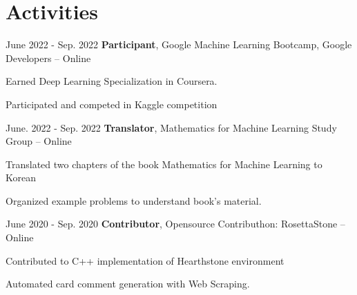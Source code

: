 \section{Activities}

\begin{twocolentry}{
June 2022 - Sep. 2022
}
\textbf{Participant}, Google Machine Learning Bootcamp, Google Developers -- Online
\end{twocolentry}

\vspace{0.10 cm}
\begin{onecolentry}
\begin{highlights}
\item Earned Deep Learning Specialization in Coursera.
\item Participated and competed in Kaggle competition
\end{highlights}
\end{onecolentry}

\vspace{0.2 cm}

\begin{twocolentry}{
June. 2022 - Sep. 2022
}
\textbf{Translator}, Mathematics for Machine Learning Study Group -- Online
\end{twocolentry}

\vspace{0.10 cm}
\begin{onecolentry}
\begin{highlights}
\item Translated two chapters of the book Mathematics for Machine Learning to Korean
\item Organized example problems to understand book's material.
\end{highlights}
\end{onecolentry}

\vspace{0.2 cm}

\begin{twocolentry}{
June 2020 - Sep. 2020
}
\textbf{Contributor}, Opensource Contributhon: RosettaStone -- Online
\end{twocolentry}

\vspace{0.10 cm}
\begin{onecolentry}
\begin{highlights}
\item Contributed to C++ implementation of Hearthstone environment
\item Automated card comment generation with Web Scraping.
\end{highlights}
\end{onecolentry}
